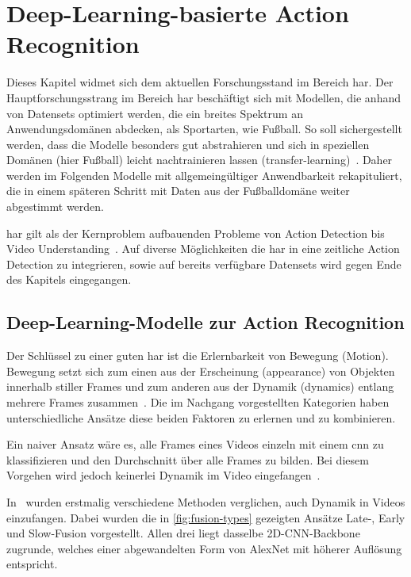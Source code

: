 \chapter{Deep-Learning-basierte Action Recognition}
\label{ch:sota}

Dieses Kapitel widmet sich dem aktuellen Forschungsstand im Bereich \gls{har}.
Der Hauptforschungsstrang im Bereich \gls{har} beschäftigt sich mit Modellen, die anhand von Datensets optimiert werden, die ein breites Spektrum an Anwendungsdomänen abdecken, als Sportarten, wie Fußball.
So soll sichergestellt werden, dass die Modelle besonders gut abstrahieren und sich in speziellen Domänen (hier Fußball) leicht nachtrainieren lassen (\gls{transfer-learning})~\cite{Burkov19}.
Daher werden im Folgenden Modelle mit allgemeingültiger Anwendbarkeit rekapituliert, die in einem späteren Schritt mit Daten aus der Fußballdomäne weiter abgestimmt werden.

\gls{har} gilt als der Kernproblem aufbauenden Probleme von Action Detection bis Video Understanding~\cite{Jiang19,Xia20}.
Auf diverse Möglichkeiten die \gls{har} in eine zeitliche Action Detection zu integrieren, sowie auf bereits verfügbare Datensets wird gegen Ende des Kapitels eingegangen.

\section{Deep-Learning-Modelle zur Action Recognition}
\label{sec:deep-learning-modelle-zur-action-recognition}

Der Schlüssel zu einer guten \gls{har} ist die Erlernbarkeit von Bewegung (Motion).
Bewegung setzt sich zum einen aus der Erscheinung (appearance) von Objekten innerhalb stiller Frames und zum anderen aus der Dynamik (dynamics) entlang mehrere Frames zusammen~\cite{Sun15,Wang16}.
Die im Nachgang vorgestellten Kategorien haben unterschiedliche Ansätze diese beiden Faktoren zu erlernen und zu kombinieren.

Ein naiver Ansatz wäre es, alle Frames eines Videos einzeln mit einem \gls{cnn} zu klassifizieren und den Durchschnitt über alle Frames zu bilden.
Bei diesem Vorgehen wird jedoch keinerlei Dynamik im Video eingefangen~\cite{Karpathy14}.

In~\cite{Karpathy14} wurden erstmalig verschiedene Methoden verglichen, auch Dynamik in Videos einzufangen.
Dabei wurden die in \autoref{fig:fusion-types} gezeigten Ansätze Late-, Early und Slow-Fusion vorgestellt.
Allen drei liegt dasselbe 2D-CNN-Backbone zugrunde, welches einer abgewandelten Form von AlexNet mit höherer Auflösung entspricht.

